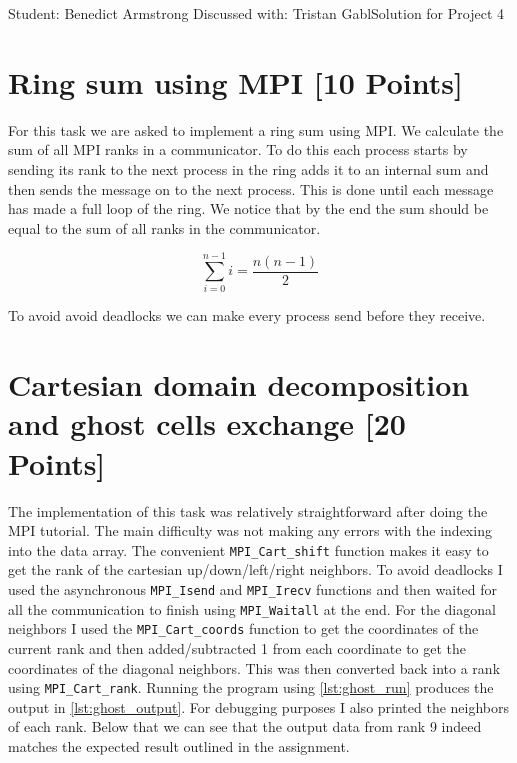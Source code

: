 \documentclass[unicode,11pt,a4paper,oneside,numbers=endperiod,openany]{scrartcl}
\begin{document}
\setassignment
{}

{Student: Benedict Armstrong}
{Discussed with: Tristan Gabl}{Solution for Project 4}{}
\newline


\section{Ring sum using MPI [10 Points]}
For this task we are asked to implement a ring sum using MPI. We calculate the sum of all MPI ranks in a communicator. To do this each process starts by sending its rank to the next process in the ring adds it to an internal sum and then sends the message on to the next process. This is done until each message has made a full loop of the ring. We notice that by the end the sum should be equal to the sum of all ranks in the communicator.

$$
      \sum_{i=0}^{n-1} i = \frac{n(n-1)}{2}
$$


To avoid avoid deadlocks we can make every process send before they receive.


\section{Cartesian domain decomposition and ghost cells exchange [20 Points]}

The implementation of this task was relatively straightforward after doing the MPI tutorial. The main difficulty was not making any errors with the indexing into the data array. The convenient \texttt{MPI\_Cart\_shift} function makes it easy to get the rank of the cartesian up/down/left/right neighbors. To avoid deadlocks I used the asynchronous \texttt{MPI\_Isend} and \texttt{MPI\_Irecv} functions and then waited for all the communication to finish using \texttt{MPI\_Waitall} at the end.
For the diagonal neighbors I used the \texttt{MPI\_Cart\_coords} function to get the coordinates of the current rank and then added/subtracted 1 from each coordinate to get the coordinates of the diagonal neighbors. This was then converted back into a rank using \texttt{MPI\_Cart\_rank}. Running the program using \ref{lst:ghost_run} produces the output in \ref{lst:ghost_output}. For debugging purposes I also printed the neighbors of each rank. Below that we can see that the output data from rank 9 indeed matches the expected result outlined in the assignment.
\end{document}
